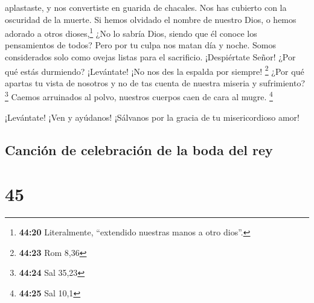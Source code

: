 aplastaste, y nos convertiste en guarida de chacales. Nos has cubierto
con la oscuridad de la muerte.  Si hemos olvidado el
nombre de nuestro Dios, o hemos adorado a otros dioses,\footnote{\textbf{44:20}
  Literalmente, ``extendido nuestras manos a otro dios''.}
 ¿No lo sabría Dios, siendo que él conoce los
pensamientos de todos?  Pero por tu culpa nos matan día y
noche. Somos considerados solo como ovejas listas para el sacrificio.
 ¡Despiértate Señor! ¿Por qué estás durmiendo?
¡Levántate! ¡No nos des la espalda por siempre! \footnote{\textbf{44:23}
  Rom 8,36}  ¿Por qué apartas tu vista de nosotros y no
de tas cuenta de nuestra miseria y sufrimiento? \footnote{\textbf{44:24}
  Sal 35,23}  Caemos arruinados al polvo, nuestros
cuerpos caen de cara al mugre. \footnote{\textbf{44:25} Sal 10,1}

 ¡Levántate! ¡Ven y ayúdanos! ¡Sálvanos por la gracia de
tu misericordioso amor!

\hypertarget{canciuxf3n-de-celebraciuxf3n-de-la-boda-del-rey}{%
\subsection{Canción de celebración de la boda del
rey}\label{canciuxf3n-de-celebraciuxf3n-de-la-boda-del-rey}}

\hypertarget{section-44}{%
\section{45}\label{section-44}}

